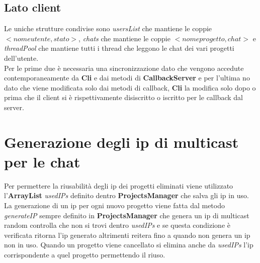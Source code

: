 \documentclass[11pt]{report}
\begin{document}
	\subsection{Lato client}
	Le uniche strutture condivise sono \textit{usersList} che mantiene le coppie $<nome utente, stato>$, \textit{chats} che mantiene le coppie $<nome progetto, chat>$ e \textit{threadPool} che mantiene tutti i thread che leggono le chat dei vari progetti dell'utente.\\ 
	Per le prime due è necessaria una sincronizzazione dato che vengono accedute contemporaneamente da \textbf{Cli} e dai metodi di \textbf{CallbackServer} e per l'ultima no dato che viene modificata solo dai metodi di callback, \textbf{Cli} la modifica solo dopo o prima che il client si è rispettivamente disiscritto o iscritto per le callback dal server.
	
	\section{Generazione degli ip di multicast per le chat}
	Per permettere la riusabilità degli ip dei progetti eliminati viene utilizzato l'\textbf{ArrayList} \textit{usedIPs} definito dentro \textbf{ProjectsManager} che salva gli ip in uso.
	La generazione di un ip per ogni nuovo progetto viene fatta dal metodo \textit{generateIP} sempre definito in \textbf{ProjectsManager} che genera un ip di multicast random controlla che non si trovi dentro \textit{usedIPs} e se questa condizione è verificata ritorna l'ip generato altrimenti reitera fino a quando non genera un ip non in uso.
	Quando un progetto viene cancellato si elimina anche da \textit{usedIPs} l'ip corrispondente a quel progetto permettendo il riuso.
	
	
\end{document}
